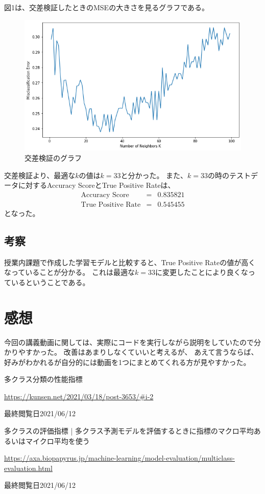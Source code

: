 \documentclass[12pt]{jarticle}
\begin{document}
図1は、交差検証したときのMSEの大きさを見るグラフである。
\begin{figure}[h]
    \begin{center}
        \includegraphics[scale=0.6]{kadai2_2_1.png}
    \end{center}
    \caption{交差検証のグラフ}
\end{figure}

交差検証より、最適な$k$の値は$k=33$と分かった。
また、$k=33$の時のテストデータに対するAccuracy ScoreとTrue Positive Rateは、
\begin{eqnarray}
    \text{Accuracy Score}&=& 0.835821 \nonumber \\
    \text{True Positive Rate}&=& 0.545455 \nonumber
\end{eqnarray}
となった。

\subsection{考察}
授業内課題で作成した学習モデルと比較すると、True Positive Rateの値が高くなっていることが分かる。
これは最適な$k=33$に変更したことにより良くなっているということである。

\section{感想}
今回の講義動画に関しては、実際にコードを実行しながら説明をしていたので分かりやすかった。
改善はあまりしなくていいと考えるが、
あえて言うならば、好みがわかれるが自分的には動画を1つにまとめてくれる方が見やすかった。

\begin{thebibliography}{99}
    \label{sannkoubunnkenn_chapter}
    多クラス分類の性能指標

    \url{https://kunsen.net/2021/03/18/post-3653/#i-2}

    最終閲覧日2021/06/12

    多クラスの評価指標 | 多クラス予測モデルを評価するときに指標のマクロ平均あるいはマイクロ平均を使う

    \url{https://axa.biopapyrus.jp/machine-learning/model-evaluation/multiclass-evaluation.html}

    最終閲覧日2021/06/12
\end{thebibliography}
\end{document}
